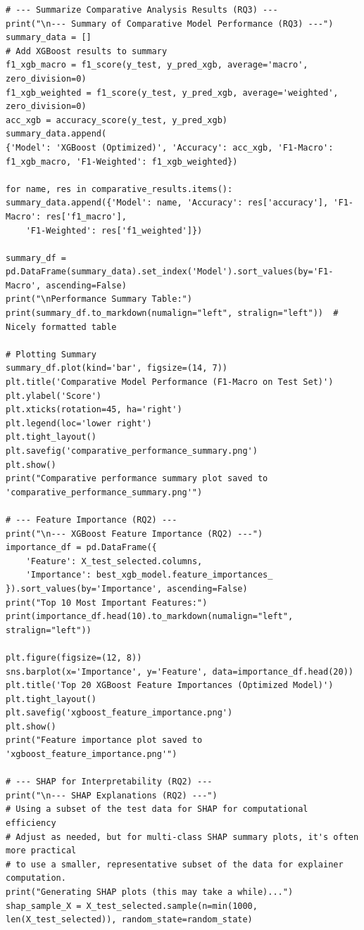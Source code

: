\begin{lstlisting}[caption={Complete pipeline of XGBoost using CIC-IDS2017 in NIDS using Python}, label={lst:python-pipeline}]
# --- Summarize Comparative Analysis Results (RQ3) ---
print("\n--- Summary of Comparative Model Performance (RQ3) ---")
summary_data = []
# Add XGBoost results to summary
f1_xgb_macro = f1_score(y_test, y_pred_xgb, average='macro', zero_division=0)
f1_xgb_weighted = f1_score(y_test, y_pred_xgb, average='weighted', zero_division=0)
acc_xgb = accuracy_score(y_test, y_pred_xgb)
summary_data.append(
{'Model': 'XGBoost (Optimized)', 'Accuracy': acc_xgb, 'F1-Macro': f1_xgb_macro, 'F1-Weighted': f1_xgb_weighted})

for name, res in comparative_results.items():
summary_data.append({'Model': name, 'Accuracy': res['accuracy'], 'F1-Macro': res['f1_macro'],
	'F1-Weighted': res['f1_weighted']})

summary_df = pd.DataFrame(summary_data).set_index('Model').sort_values(by='F1-Macro', ascending=False)
print("\nPerformance Summary Table:")
print(summary_df.to_markdown(numalign="left", stralign="left"))  # Nicely formatted table

# Plotting Summary
summary_df.plot(kind='bar', figsize=(14, 7))
plt.title('Comparative Model Performance (F1-Macro on Test Set)')
plt.ylabel('Score')
plt.xticks(rotation=45, ha='right')
plt.legend(loc='lower right')
plt.tight_layout()
plt.savefig('comparative_performance_summary.png')
plt.show()
print("Comparative performance summary plot saved to 'comparative_performance_summary.png'")

# --- Feature Importance (RQ2) ---
print("\n--- XGBoost Feature Importance (RQ2) ---")
importance_df = pd.DataFrame({
	'Feature': X_test_selected.columns,
	'Importance': best_xgb_model.feature_importances_
}).sort_values(by='Importance', ascending=False)
print("Top 10 Most Important Features:")
print(importance_df.head(10).to_markdown(numalign="left", stralign="left"))

plt.figure(figsize=(12, 8))
sns.barplot(x='Importance', y='Feature', data=importance_df.head(20))
plt.title('Top 20 XGBoost Feature Importances (Optimized Model)')
plt.tight_layout()
plt.savefig('xgboost_feature_importance.png')
plt.show()
print("Feature importance plot saved to 'xgboost_feature_importance.png'")

# --- SHAP for Interpretability (RQ2) ---
print("\n--- SHAP Explanations (RQ2) ---")
# Using a subset of the test data for SHAP for computational efficiency
# Adjust as needed, but for multi-class SHAP summary plots, it's often more practical
# to use a smaller, representative subset of the data for explainer computation.
print("Generating SHAP plots (this may take a while)...")
shap_sample_X = X_test_selected.sample(n=min(1000, len(X_test_selected)), random_state=random_state)


\end{lstlisting}
